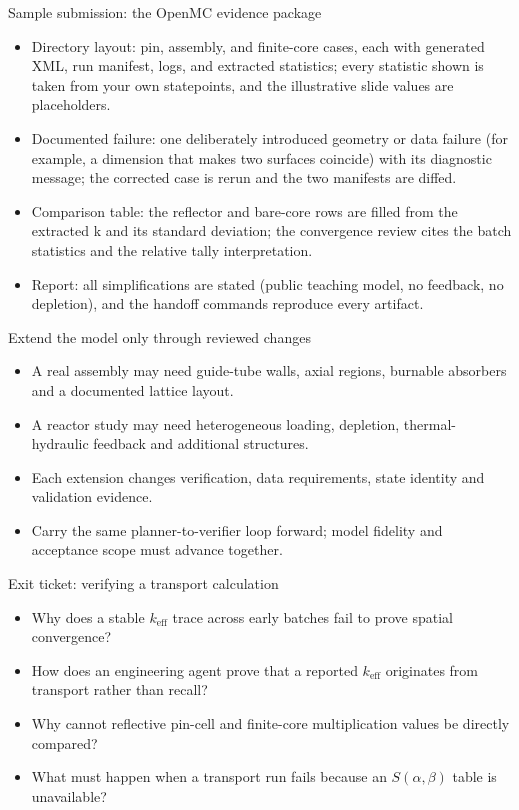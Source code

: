 \documentclass[aspectratio=169,11pt]{beamer}
\begin{document}
\begin{frame}[t,fragile]{Sample submission: the OpenMC evidence package}
\fontsize{11.5}{14}\selectfont
\begin{itemize}\setlength{\itemsep}{2mm}
\item Directory layout: pin, assembly, and finite-core cases, each with generated XML, run manifest, logs, and extracted statistics; every statistic shown is taken from your own statepoints, and the illustrative slide values are placeholders.
\item Documented failure: one deliberately introduced geometry or data failure (for example, a dimension that makes two surfaces coincide) with its diagnostic message; the corrected case is rerun and the two manifests are diffed.
\item Comparison table: the reflector and bare-core rows are filled from the extracted k and its standard deviation; the convergence review cites the batch statistics and the relative tally interpretation.
\item Report: all simplifications are stated (public teaching model, no feedback, no depletion), and the handoff commands reproduce every artifact.
\end{itemize}
\end{frame}
\begin{frame}[t,fragile]{Extend the model only through reviewed changes}
\fontsize{11.5}{14}\selectfont
\begin{itemize}\setlength{\itemsep}{2mm}
\item A real assembly may need guide-tube walls, axial regions, burnable absorbers and a documented lattice layout.
\item A reactor study may need heterogeneous loading, depletion, thermal-hydraulic feedback and additional structures.
\item Each extension changes verification, data requirements, state identity and validation evidence.
\item Carry the same planner-to-verifier loop forward; model fidelity and acceptance scope must advance together.
\end{itemize}
\end{frame}
\begin{frame}[t,fragile]{Exit ticket: verifying a transport calculation}
\fontsize{11.5}{14}\selectfont
\begin{itemize}\setlength{\itemsep}{2mm}
\item Why does a stable $k_{\mathrm{eff}}$ trace across early batches fail to prove spatial convergence?
\item How does an engineering agent prove that a reported $k_{\mathrm{eff}}$ originates from transport rather than recall?
\item Why cannot reflective pin-cell and finite-core multiplication values be directly compared?
\item What must happen when a transport run fails because an $S(\alpha,\beta)$ table is unavailable?
\end{itemize}
\end{frame}
\end{document}
